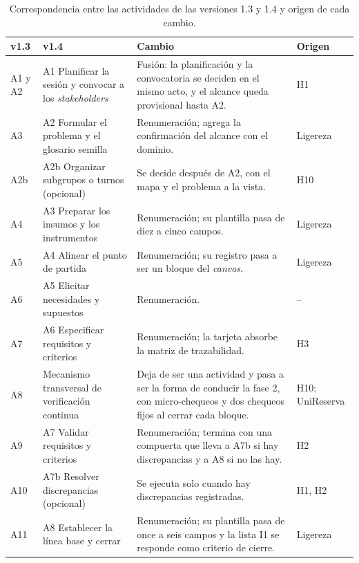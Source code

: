 \documentclass[12pt,letterpaper,oneside]{report}
\begin{document}
\begin{table}[H]
\caption{Correspondencia entre las actividades de las versiones 1.3 y 1.4 y origen de cada cambio.}
\label{tab:v13_v14}
\centering
\footnotesize
\renewcommand{\arraystretch}{1.12}
\begin{tabularx}{\textwidth}{@{}L{1.3cm}L{3.6cm}Y L{2.0cm}@{}}
\toprule
\textbf{v1.3} & \textbf{v1.4} & \textbf{Cambio} & \textbf{Origen} \\
\midrule
A1 y A2 & A1 Planificar la sesión y convocar a los \textit{stakeholders} &
Fusión: la planificación y la convocatoria se deciden en el mismo acto, y el
alcance queda provisional hasta A2. & H1 \\
A3 & A2 Formular el problema y el glosario semilla & Renumeración; agrega la
confirmación del alcance con el dominio. & Ligereza \\
A2b & A2b Organizar subgrupos o turnos (opcional) & Se decide después de A2,
con el mapa y el problema a la vista. & H10 \\
A4 & A3 Preparar los insumos y los instrumentos & Renumeración; su plantilla
pasa de diez a cinco campos. & Ligereza \\
A5 & A4 Alinear el punto de partida & Renumeración; su registro pasa a ser un
bloque del \textit{canvas}. & Ligereza \\
A6 & A5 Elicitar necesidades y supuestos & Renumeración. & -- \\
A7 & A6 Especificar requisitos y criterios & Renumeración; la tarjeta absorbe la
matriz de trazabilidad. & H3 \\
A8 & Mecanismo transversal de verificación continua & Deja de ser una
actividad y pasa a ser la forma de conducir la fase 2, con micro-chequeos y dos
chequeos fijos al cerrar cada bloque. & H10; UniReserva \\
A9 & A7 Validar requisitos y criterios & Renumeración; termina con una
compuerta que lleva a A7b si hay discrepancias y a A8 si no las hay. & H2 \\
A10 & A7b Resolver discrepancias (opcional) & Se ejecuta solo cuando hay
discrepancias registradas. & H1, H2 \\
A11 & A8 Establecer la línea base y cerrar & Renumeración; su plantilla pasa
de once a seis campos y la lista I1 se responde como criterio de cierre. &
Ligereza \\
\bottomrule
\end{tabularx}
\end{table}
\end{document}
